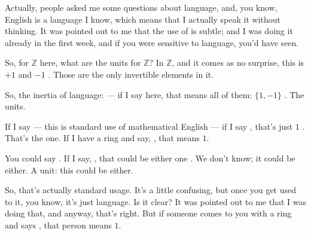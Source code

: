 \begin{speech}[00:26:22 - 00:28:16]
Actually, people asked me some questions about language, and, you know, English is a language I know, which means that I actually speak it without thinking. It was pointed out to me that the use of  is subtle; and I was doing it already in the first week, and if you were sensitive to language, you'd have seen.

So, for $\mathbb{Z}$ here, what are the units for $\mathbb{Z}$?  In $\mathbb{Z}$, and it comes as no surprise, this is $+1$ and $-1$ . Those are the only invertible elements in it.

So, the inertia of language:   --- if I say  here, that means all of them: $\{1, -1\}$ . The units.

If I say   --- this is standard use of mathematical English --- if I say , that's just $1$ . That's the one. If I have a ring and say, , that means $1$.

You could say  . If I say, , that could be either one . We don't know; it could be either. A unit: this could be either.

So, that's actually standard usage. It's a little confusing, but once you get used to it, you know, it's just language. Is it clear? It was pointed out to me that I was doing that, and anyway, that's right. But if someone comes to you with a ring and says , that person means $1$.
\end{speech}

